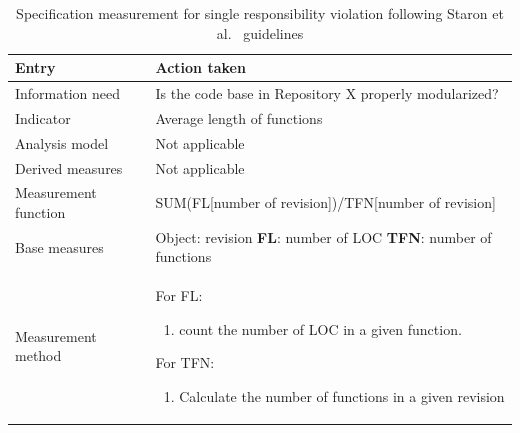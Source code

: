     \begin{table}[!htb]
		\centering
		\tabulinesep=1.2mm
        \begin{tabu} to \textwidth {|X|X[2]|}
			    
			\hline
			\textbf{Entry} & \textbf{Action taken} \\ 
			\hline
			
			Information need & Is the code base in Repository X properly modularized? \\
			\hline
			
			Indicator & Average length of functions \\
			\hline
			
			Analysis model & Not applicable \\
			\hline
			
			Derived measures & Not applicable \\
			\hline
			
			Measurement function & SUM(FL[number of revision])/TFN[number of revision] \\
			\hline
			
			Base measures & Object: revision \newline
			                    \textbf{FL}: number of LOC \newline
			                    \textbf{TFN}: number of functions \\
		    \hline
			
			Measurement method & For FL:
			    \begin{enumerate}
			    \item count the number of LOC in a given function.
			    \end{enumerate}
			
			For TFN:
			\begin{enumerate}
			\item Calculate the number of functions in a given revision
			\end{enumerate}
			
			\\
			\hline

				
		\end{tabu}
		\caption[Specification measurement for single responsibility violation]
        {Specification measurement for single responsibility violation following Staron et al.\ \cite{metrics_paper} guidelines}
        \label{tab:length_measurement_system}
    \end{table}

\FloatBarrier

